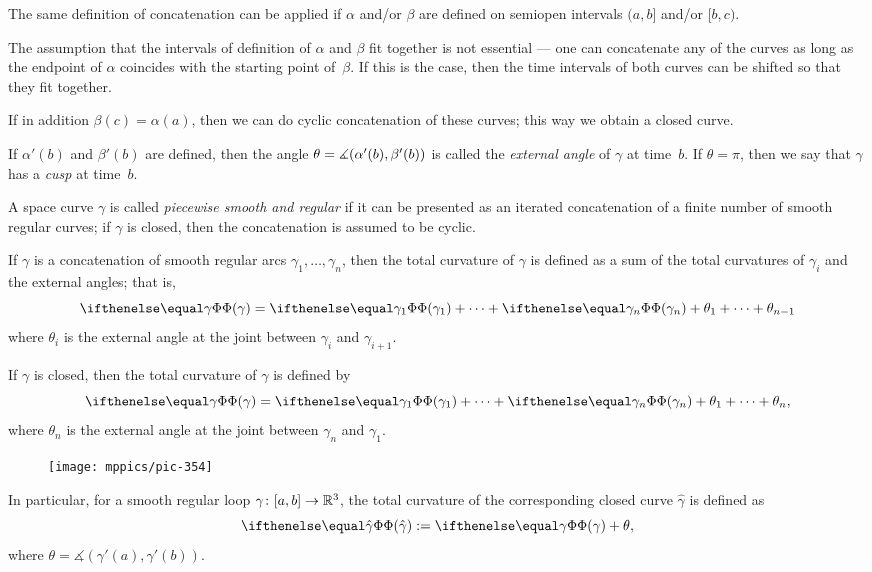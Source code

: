 The same definition of concatenation can be applied if $\alpha$ and/or $\beta$ are defined on semiopen intervals 
$(a,b]$ and/or $[b,c)$.

The assumption that the intervals of definition of $\alpha$ and $\beta$ fit together is not essential --- one can concatenate any of the curves as long as the endpoint of $\alpha$ coincides with the starting point of~$\beta$.
If this is the case, then the time intervals of both curves can be shifted so that they fit together. 

If in addition $\beta(c)=\alpha(a)$, then we can do cyclic concatenation of these curves;
this way we obtain a closed curve.

If $\alpha'(b)$ and $\beta'(b)$ are defined, then the angle $\theta\z=\measuredangle(\alpha'(b),\beta'(b))$ is called the \emph{external angle} of $\gamma$ at time~$b$.
If $\theta=\pi$, then we say that $\gamma$ has a \emph{cusp} at  time~$b$.

A space curve $\gamma$ is called \emph{piecewise smooth and regular} if it can be presented as an iterated concatenation of a finite number of smooth regular curves; if $\gamma$ is closed, then the  concatenation is assumed to be cyclic.

If $\gamma$ is a concatenation of smooth regular arcs $\gamma_1,\dots,\gamma_n$, then the total curvature of $\gamma$ is defined as a sum of the total curvatures of $\gamma_i$ and the external angles;
that is, 
\[\tc\gamma=\tc{\gamma_1}+\dots+\tc{\gamma_n}+\theta_1+\dots+\theta_{n-1}\]
where $\theta_i$ is the external angle at the joint between $\gamma_i$ and $\gamma_{i+1}$.

If $\gamma$ is closed, then the total curvature of $\gamma$ is defined by
\[\tc\gamma=\tc{\gamma_1}+\dots+\tc{\gamma_n}+\theta_1+\dots+\theta_{n},\]
where $\theta_n$ is the external angle at the joint between $\gamma_n$ and $\gamma_1$.

{

\begin{wrapfigure}{r}{23 mm}
\vskip-3mm
\centering
\texttt{[image: mppics/pic-354]}
\end{wrapfigure}

In particular, for a smooth regular loop $\gamma\:[a,b] \z\to \mathbb{R}^3$, the total curvature of the corresponding closed curve $\hat\gamma$ is defined as
\[\tc{\hat\gamma}\df\tc\gamma + \theta,\]
where $\theta=\measuredangle(\gamma'(a),\gamma'(b))$.

}

